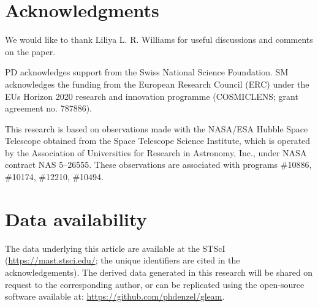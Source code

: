 \clearpage


% 
  
% 

% 

% 

% 

% 


\section*{Acknowledgments}

  We would like to thank Liliya L. R. Williams for useful discussions and
  comments on the paper.


  PD acknowledges support from the Swiss National Science Foundation.  SM
  acknowledges the funding from the European Research Council (ERC) under the
  EUs Horizon 2020 research and innovation programme (COSMICLENS; grant
  agreement no. 787886).

  This research is based on observations made with the NASA/ESA Hubble Space
  Telescope obtained from the Space Telescope Science Institute, which is
  operated by the Association of Universities for Research in Astronomy, Inc.,
  under NASA contract NAS 5–26555. These observations are associated with
  programs \#10886, \#10174, \#12210, \#10494.

\section*{Data availability}
  The data underlying this article are available at the STScI
  (\href{https://mast.stsci.edu/}{https://mast.stsci.edu/}; the unique
  identifiers are cited in the acknowledgements).  The derived data generated in
  this research will be shared on request to the corresponding author, or can be
  replicated using the open-source software available at:
  \faGithub\;\href{https://github.com/phdenzel/gleam}{https://github.com/phdenzel/gleam}.